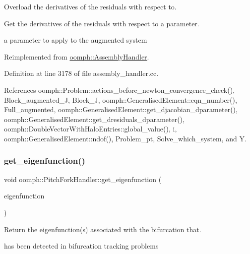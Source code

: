 Overload the derivatives of the residuals with respect to. 

Get the derivatives of the residuals with respect to a parameter.

a parameter to apply to the augmented system 

Reimplemented from \hyperlink{classoomph_1_1AssemblyHandler_a2ee980ccabe0ad82f98e694eecf270bb}{oomph\+::\+Assembly\+Handler}.



Definition at line 3178 of file assembly\+\_\+handler.\+cc.



References oomph\+::\+Problem\+::actions\+\_\+before\+\_\+newton\+\_\+convergence\+\_\+check(), Block\+\_\+augmented\+\_\+J, Block\+\_\+J, oomph\+::\+Generalised\+Element\+::eqn\+\_\+number(), Full\+\_\+augmented, oomph\+::\+Generalised\+Element\+::get\+\_\+djacobian\+\_\+dparameter(), oomph\+::\+Generalised\+Element\+::get\+\_\+dresiduals\+\_\+dparameter(), oomph\+::\+Double\+Vector\+With\+Halo\+Entries\+::global\+\_\+value(), i, oomph\+::\+Generalised\+Element\+::ndof(), Problem\+\_\+pt, Solve\+\_\+which\+\_\+system, and Y.

\mbox{\label{classoomph_1_1PitchForkHandler_a9d5e1388fe0ede6834a249b98168b71a}} 
\subsubsection{\texorpdfstring{get\+\_\+eigenfunction()}{get\_eigenfunction()}}
{\footnotesize\ttfamily void oomph\+::\+Pitch\+Fork\+Handler\+::get\+\_\+eigenfunction (\begin{DoxyParamCaption}\item[{\hyperlink{classoomph_1_1Vector}{Vector}$<$ \hyperlink{classoomph_1_1DoubleVector}{Double\+Vector} $>$ \&}]{eigenfunction }\end{DoxyParamCaption})\hspace{0.3cm}{\ttfamily [virtual]}}



Return the eigenfunction(s) associated with the bifurcation that. 

has been detected in bifurcation tracking problems

